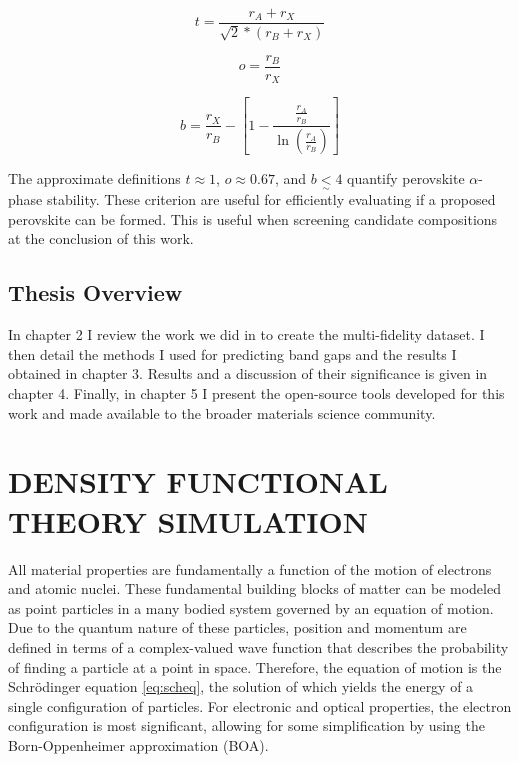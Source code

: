 \begin{equation}
\label{eq:t}
t = \frac{r_A+r_X}{\sqrt{2}*(r_B+r_X)}
\end{equation}

\begin{equation}
\label{eq:o}
o=\frac{r_B}{r_X}
\end{equation}

\begin{equation}
\label{eq:b}
b = \frac{r_X}{r_B}-\left[ 1-\frac{\frac{r_A}{r_B}}{\ln(\frac{r_A}{r_B})} \right]
\end{equation}

The approximate definitions \(t \approx 1\), \(o \approx 0.67\), and \(b \underset{\sim}{<} 4\) quantify perovskite \(\alpha\)-phase stability.
\autocite{yin-2015-halid-perov,bartel-2019-new-toler}
These criterion are useful for efficiently evaluating if a proposed perovskite can be formed.
This is useful when screening candidate compositions at the conclusion of this work.

\section{Thesis Overview}
In chapter 2 I review the work we did in  to create the multi-fidelity dataset.
I then detail the methods I used for predicting band gaps and the results I obtained in chapter 3.
Results and a discussion of their significance is given in chapter 4.
Finally, in chapter 5 I present the open-source tools developed for this work and made available to the broader materials science community.
\label{sec:org3722640}

\chapter{DENSITY FUNCTIONAL THEORY SIMULATION}
\label{sec:org44ac04c}
All material properties are fundamentally a function of the motion of electrons and atomic nuclei.
These fundamental building blocks of matter can be modeled as point particles in a many bodied system governed by an equation of motion.
Due to the quantum nature of these particles, position and momentum are defined in terms of a complex-valued wave function that describes the probability of finding a particle at a point in space.
Therefore, the equation of motion is the Schrödinger equation \eqref{eq:scheq}, the solution of which yields the energy of a single configuration of particles.
For electronic and optical properties, the electron configuration is most significant, allowing for some simplification by using the Born-Oppenheimer approximation (BOA).

